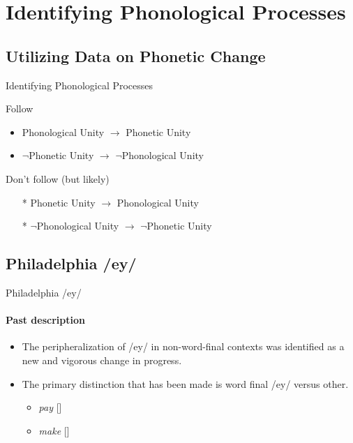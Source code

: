\documentclass[]{beamer}
\begin{document}
\section{Identifying Phonological Processes}

\subsection{Utilizing Data on Phonetic Change}

\begin{frame}{Identifying Phonological Processes}

	\begin{block}{Follow}
		\begin{itemize}
			\item Phonological Unity $\rightarrow$ Phonetic Unity
			\item $\neg$Phonetic Unity $\rightarrow$ $\neg$Phonological Unity
		\end{itemize}
	\end{block}
	
	\begin{block}{Don't follow (but likely)}
		\begin{itemize}
			\item [*] Phonetic Unity $\rightarrow$ Phonological Unity
			\item [*] $\neg$Phonological Unity $\rightarrow$ $\neg$Phonetic Unity
		\end{itemize}
	\end{block}
\end{frame}



\subsection{Philadelphia /ey/}

\begin{frame}{Philadelphia /ey/}
	\framesubtitle{Past description}

			\begin{itemize}
				\item The peripheralization of /ey/ in non-word-final contexts was identified as
						a new and vigorous change in progress.
				\item The primary distinction that has been made is word final /ey/ versus other.
					\begin{itemize}
						\item {\it pay} []
						\item {\it make} []
					\end{itemize}
			\end{itemize}
\end{frame}
\end{document}
